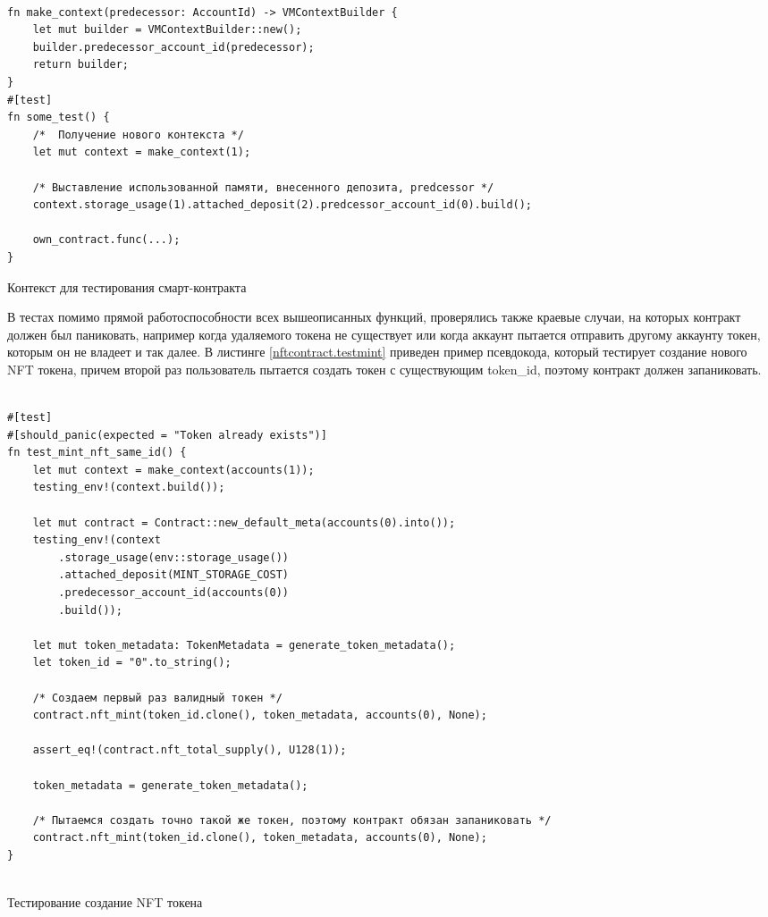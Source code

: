 \begin{listing}
\begin{verbatim}

fn make_context(predecessor: AccountId) -> VMContextBuilder {
    let mut builder = VMContextBuilder::new();
    builder.predecessor_account_id(predecessor);
    return builder;
}
#[test]
fn some_test() {
    /*  Получение нового контекста */
    let mut context = make_context(1);

    /* Выставление использованной памяти, внесенного депозита, predcessor */
    context.storage_usage(1).attached_deposit(2).predcessor_account_id(0).build();

    own_contract.func(...);
}

\end{verbatim}
\caption{Контекст для тестирования смарт-контракта}
\label{contract.context}
\end{listing}

В тестах помимо прямой работоспособности всех вышеописанных функций, проверялись также краевые случаи, на которых контракт должен был паниковать, например когда удаляемого токена не существует или когда аккаунт пытается отправить другому аккаунту токен, которым он не владеет и так далее.
В листинге {\color{blue}\ref{nftcontract.testmint}} приведен пример псевдокода, который тестирует создание нового NFT токена, причем второй раз пользователь пытается создать токен с существующим token\_id, поэтому контракт должен запаниковать.

\begin{listing}
\begin{verbatim}

#[test]
#[should_panic(expected = "Token already exists")]
fn test_mint_nft_same_id() {
    let mut context = make_context(accounts(1));
    testing_env!(context.build());

    let mut contract = Contract::new_default_meta(accounts(0).into());
    testing_env!(context
        .storage_usage(env::storage_usage())
        .attached_deposit(MINT_STORAGE_COST)
        .predecessor_account_id(accounts(0))
        .build());

    let mut token_metadata: TokenMetadata = generate_token_metadata();
    let token_id = "0".to_string();

    /* Создаем первый раз валидный токен */
    contract.nft_mint(token_id.clone(), token_metadata, accounts(0), None);

    assert_eq!(contract.nft_total_supply(), U128(1));

    token_metadata = generate_token_metadata();

    /* Пытаемся создать точно такой же токен, поэтому контракт обязан запаниковать */
    contract.nft_mint(token_id.clone(), token_metadata, accounts(0), None);
}


\end{verbatim}
\caption{Тестирование создание NFT токена}
\label{nftcontract.testmint}
\end{listing}

